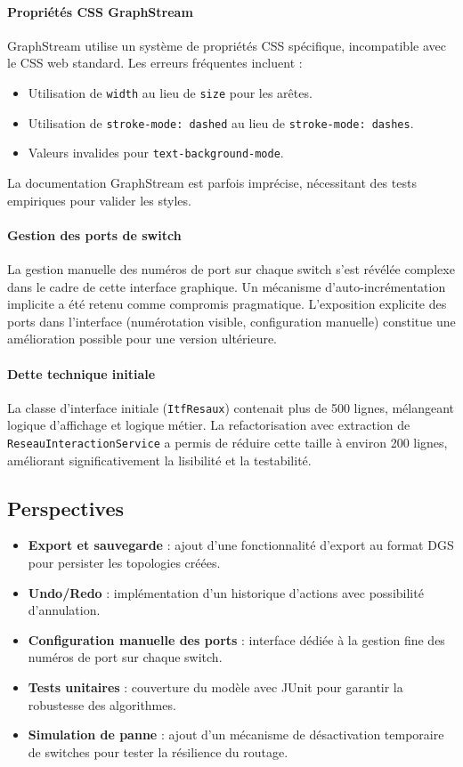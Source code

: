 \documentclass[12pt, a4paper]{article}
\begin{document}
\paragraph{Propriétés CSS GraphStream}
GraphStream utilise un système de propriétés CSS spécifique, incompatible avec le CSS web standard. Les erreurs fréquentes incluent :
\begin{itemize}
    \item Utilisation de \texttt{width} au lieu de \texttt{size} pour les arêtes.
    \item Utilisation de \texttt{stroke-mode: dashed} au lieu de \texttt{stroke-mode: dashes}.
    \item Valeurs invalides pour \texttt{text-background-mode}.
\end{itemize}

La documentation GraphStream est parfois imprécise, nécessitant des tests empiriques pour valider les styles.

\paragraph{Gestion des ports de switch}
La gestion manuelle des numéros de port sur chaque switch s'est révélée complexe dans le cadre de cette interface graphique. Un mécanisme d'auto-incrémentation implicite a été retenu comme compromis pragmatique. L'exposition explicite des ports dans l'interface (numérotation visible, configuration manuelle) constitue une amélioration possible pour une version ultérieure.

\paragraph{Dette technique initiale}
La classe d'interface initiale (\texttt{ItfResaux}) contenait plus de 500 lignes, mélangeant logique d'affichage et logique métier. La refactorisation avec extraction de \texttt{ReseauInteractionService} a permis de réduire cette taille à environ 200 lignes, améliorant significativement la lisibilité et la testabilité.

\subsection{Perspectives}

\begin{itemize}
    \item \textbf{Export et sauvegarde} : ajout d'une fonctionnalité d'export au format DGS pour persister les topologies créées.
    \item \textbf{Undo/Redo} : implémentation d'un historique d'actions avec possibilité d'annulation.
    \item \textbf{Configuration manuelle des ports} : interface dédiée à la gestion fine des numéros de port sur chaque switch.
    \item \textbf{Tests unitaires} : couverture du modèle avec JUnit pour garantir la robustesse des algorithmes.
    \item \textbf{Simulation de panne} : ajout d'un mécanisme de désactivation temporaire de switches pour tester la résilience du routage.
\end{itemize}
\end{document}
